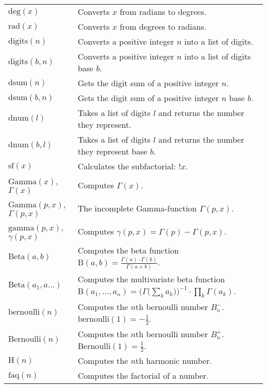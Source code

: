 \documentclass[10pt]{article}
\newcommand{\tabgap}{\vspace{3mm}\\}
\begin{document}
\begin{longtable}{p{}p{}}
        $ \mathrm{deg}(x) $                        & Converts $ x $ from radians to degrees. \\
        $ \mathrm{rad}(x) $                        & Converts $ x $ from degrees to radians. \tabgap
        $ \mathrm{digits}(n) $                     & Converts a positive integer $ n $ into a list of digits. \\
        $ \mathrm{digits}(b,n) $                   & Converts a positive integer $ n $ into a list of digits base $ b $. \\
        $ \mathrm{dsum}(n) $                       & Gets the digit sum of a positive integer $ n $. \\
        $ \mathrm{dsum}(b,n) $                     & Gets the digit sum of a positive integer $ n $ base $ b $. \\
        $ \mathrm{dnum}(l) $                       & Takes a list of digits $ l $ and returns the number they represent. \\
        $ \mathrm{dnum}(b,l) $                     & Takes a list of digits $ l $ and returns the number they represent base $ b $. \tabgap
        $ \mathrm{sf}(x) $                         & Calculates the subfactorial: $ !x $. \\
        $ \mathrm{Gamma}(x) $, $ \Gamma(x) $       & Computes $ \Gamma(x) $. \\
        $ \mathrm{Gamma}(p, x) $, $ \Gamma(p, x) $ & The incomplete Gamma-function $ \Gamma(p, x) $. \\
        $ \mathrm{gamma}(p, x) $, $ \gamma(p, x) $ & Computes $ \gamma(p, x) = \Gamma(p) - \Gamma(p, x) $. \\
        $ \mathrm{Beta}(a, b) $                    & Computes the beta function $ \mathrm{B}(a, b) = \frac{\Gamma(a) \cdot \Gamma(b)}{\Gamma(a + b)} $. \\
        $ \mathrm{Beta}(a_1, a...) $               & Computes the multivariate beta function $ \mathrm{B}(a_1, \dots, a_n) = \Big(\Gamma\big(\sum_k a_k\big)\Big)^{-1} \cdot \prod_k \Gamma(a_k) $. \tabgap
        $ \mathrm{bernoulli}(n) $                  & Computes the $ n $th bernoulli number $ B_n^{-} $. $ \mathrm{bernoulli}(1) = -\frac{1}{2} $. \\
        $ \mathrm{Bernoulli}(n) $                  & Computes the $ n $th bernoulli number $ B_n^{+} $. $ \mathrm{Bernoulli}(1) = \frac{1}{2} $. \\
        $ \mathrm{H}(n) $                          & Computes the $ n $th harmonic number. \tabgap
        $ \mathrm{faq}(n) $                        & Computes the factorial of a number. \\

\end{longtable}
\end{document}
